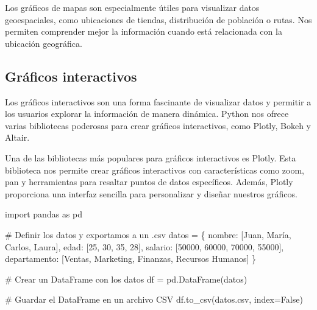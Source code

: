\documentclass[
  a4paper,
]{article}
\newenvironment{Shaded}{}{}
\newcommand{\CommentTok}[1]{\textcolor[rgb]{0.42,0.45,0.49}{#1}}
\newcommand{\DecValTok}[1]{\textcolor[rgb]{0.00,0.36,0.77}{#1}}
\newcommand{\ImportTok}[1]{\textcolor[rgb]{0.01,0.18,0.38}{#1}}
\newcommand{\NormalTok}[1]{\textcolor[rgb]{0.14,0.16,0.18}{#1}}
\newcommand{\OperatorTok}[1]{\textcolor[rgb]{0.14,0.16,0.18}{#1}}
\newcommand{\StringTok}[1]{\textcolor[rgb]{0.01,0.18,0.38}{#1}}
\newcommand{\VariableTok}[1]{\textcolor[rgb]{0.89,0.38,0.04}{#1}}
\begin{document}
Los gráficos de mapas son especialmente útiles para visualizar datos
geoespaciales, como ubicaciones de tiendas, distribución de población o
rutas. Nos permiten comprender mejor la información cuando está
relacionada con la ubicación geográfica.

\hypertarget{gruxe1ficos-interactivos}{%
\subsection{Gráficos interactivos}\label{gruxe1ficos-interactivos}}

Los gráficos interactivos son una forma fascinante de visualizar datos y
permitir a los usuarios explorar la información de manera dinámica.
Python nos ofrece varias bibliotecas poderosas para crear gráficos
interactivos, como Plotly, Bokeh y Altair.

Una de las bibliotecas más populares para gráficos interactivos es
Plotly. Esta biblioteca nos permite crear gráficos interactivos con
características como zoom, pan y herramientas para resaltar puntos de
datos específicos. Además, Plotly proporciona una interfaz sencilla para
personalizar y diseñar nuestros gráficos.

\begin{Shaded}
\begin{Highlighting}[]
\ImportTok{import}\NormalTok{ pandas }\ImportTok{as}\NormalTok{ pd}

\CommentTok{\# Definir los datos y exportamos a un .csv}
\NormalTok{datos }\OperatorTok{=}\NormalTok{ \{}
    \StringTok{\textquotesingle{}nombre\textquotesingle{}}\NormalTok{: [}\StringTok{\textquotesingle{}Juan\textquotesingle{}}\NormalTok{, }\StringTok{\textquotesingle{}María\textquotesingle{}}\NormalTok{, }\StringTok{\textquotesingle{}Carlos\textquotesingle{}}\NormalTok{, }\StringTok{\textquotesingle{}Laura\textquotesingle{}}\NormalTok{],}
    \StringTok{\textquotesingle{}edad\textquotesingle{}}\NormalTok{: [}\DecValTok{25}\NormalTok{, }\DecValTok{30}\NormalTok{, }\DecValTok{35}\NormalTok{, }\DecValTok{28}\NormalTok{],}
    \StringTok{\textquotesingle{}salario\textquotesingle{}}\NormalTok{: [}\DecValTok{50000}\NormalTok{, }\DecValTok{60000}\NormalTok{, }\DecValTok{70000}\NormalTok{, }\DecValTok{55000}\NormalTok{],}
    \StringTok{\textquotesingle{}departamento\textquotesingle{}}\NormalTok{: [}\StringTok{\textquotesingle{}Ventas\textquotesingle{}}\NormalTok{, }\StringTok{\textquotesingle{}Marketing\textquotesingle{}}\NormalTok{, }\StringTok{\textquotesingle{}Finanzas\textquotesingle{}}\NormalTok{, }\StringTok{\textquotesingle{}Recursos Humanos\textquotesingle{}}\NormalTok{]}
\NormalTok{\}}

\CommentTok{\# Crear un DataFrame con los datos}
\NormalTok{df }\OperatorTok{=}\NormalTok{ pd.DataFrame(datos)}

\CommentTok{\# Guardar el DataFrame en un archivo CSV}
\NormalTok{df.to\_csv(}\StringTok{\textquotesingle{}datos.csv\textquotesingle{}}\NormalTok{, index}\OperatorTok{=}\VariableTok{False}\NormalTok{)}
\end{Highlighting}
\end{Shaded}
\end{document}
